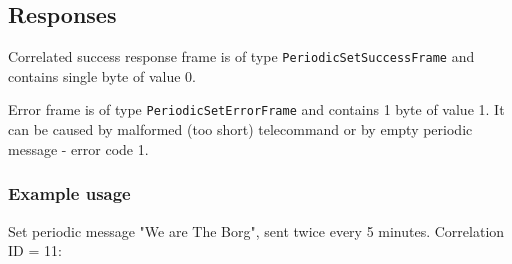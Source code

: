 \subsection{Responses}
Correlated success response frame is of type \texttt{PeriodicSetSuccessFrame} and contains single byte of value 0.

Error frame is of type \texttt{PeriodicSetErrorFrame} and contains 1 byte of value 1. It can be caused by malformed (too short) telecommand or by empty periodic message - error code 1.

\subsubsection{Example usage}
Set periodic message "We are The Borg", sent twice every 5 minutes. Correlation ID = 11:
